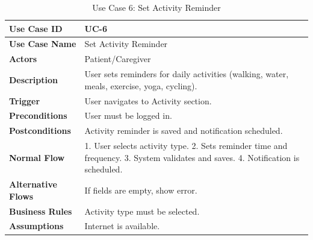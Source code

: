 \begin{table}[H]
\centering
\caption{Use Case 6: Set Activity Reminder}
\begin{tabularx}{\textwidth}{|l|X|}
\hline
\textbf{Use Case ID} & UC-6 \\ \hline
\textbf{Use Case Name} & Set Activity Reminder \\ \hline
\textbf{Actors} & Patient/Caregiver \\ \hline
\textbf{Description} & User sets reminders for daily activities (walking, water, meals, exercise, yoga, cycling). \\ \hline
\textbf{Trigger} & User navigates to Activity section. \\ \hline
\textbf{Preconditions} & User must be logged in. \\ \hline
\textbf{Postconditions} & Activity reminder is saved and notification scheduled. \\ \hline
\textbf{Normal Flow} & 1. User selects activity type. 2. Sets reminder time and frequency. 3. System validates and saves. 4. Notification is scheduled. \\ \hline
\textbf{Alternative Flows} & If fields are empty, show error. \\ \hline
\textbf{Business Rules} & Activity type must be selected. \\ \hline
\textbf{Assumptions} & Internet is available. \\ \hline
\end{tabularx}
\end{table}


